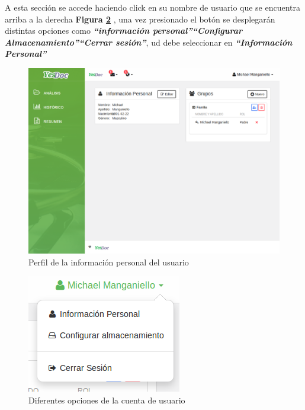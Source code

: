 A esta sección se accede haciendo click en su nombre de usuario que se encuentra arriba a la derecha \textbf{Figura \ref{mu-opcion_usuario} }, una vez presionado el botón se desplegarán distintas opciones como \textbf{\textit{``información personal''``Configurar Almacenamiento''``Cerrar sesión''}}, ud debe seleccionar en \textbf{\textit{``Información Personal''}}
  \begin{figure}
  	\centering
  	\includegraphics[width=.8\textwidth]{img/manual_de_usuario/informacion_personal}
  	\caption{Perfil de la información personal del usuario}
  	\label{mu-informacion_personal}
  \end{figure}
    \begin{figure}
    	\centering
    	\includegraphics[width=.5\textwidth]{img/manual_de_usuario/opcion_usuario}
    	\caption{Diferentes opciones de la cuenta de usuario                                                                                                                                                                                                                                                                                                                                                                                                                                                                                                  }
    	\label{mu-opcion_usuario}
    \end{figure}
    


